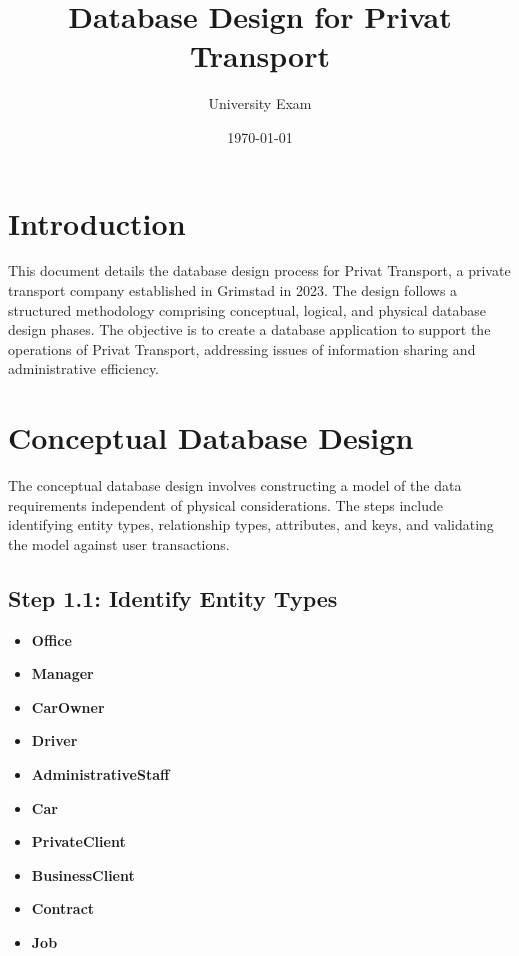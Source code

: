 \documentclass[a4paper,12pt]{article}
\title{Database Design for Privat Transport}
\author{University Exam}
\date{\today}
\begin{document}
\maketitle

\section*{Introduction}
This document details the database design process for Privat Transport, a private transport company established in Grimstad in 2023. The design follows a structured methodology comprising conceptual, logical, and physical database design phases. The objective is to create a database application to support the operations of Privat Transport, addressing issues of information sharing and administrative efficiency.

\section*{Conceptual Database Design}
The conceptual database design involves constructing a model of the data requirements independent of physical considerations. The steps include identifying entity types, relationship types, attributes, and keys, and validating the model against user transactions.

\subsection*{Step 1.1: Identify Entity Types}
\begin{itemize}
    \item \textbf{Office}
    \item \textbf{Manager}
    \item \textbf{CarOwner}
    \item \textbf{Driver}
    \item \textbf{AdministrativeStaff}
    \item \textbf{Car}
    \item \textbf{PrivateClient}
    \item \textbf{BusinessClient}
    \item \textbf{Contract}
    \item \textbf{Job}
\end{itemize}
\end{document}
